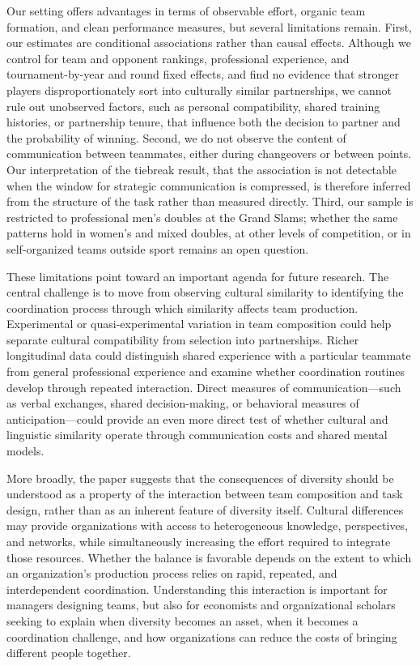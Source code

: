 \documentclass[10pt]{article}
\begin{document}
Our setting offers advantages in terms of observable effort, organic team formation, and clean performance measures, but several limitations remain. First, our estimates are conditional associations rather than causal effects. Although we control for team and opponent rankings, professional experience, and tournament-by-year and round fixed effects, and find no evidence that stronger players disproportionately sort into culturally similar partnerships, we cannot rule out unobserved factors, such as personal compatibility, shared training histories, or partnership tenure, that influence both the decision to partner and the probability of winning. Second, we do not observe the content of communication between teammates, either during changeovers or between points. Our interpretation of the tiebreak result, that the association is not detectable when the window for strategic communication is compressed, is therefore inferred from the structure of the task rather than measured directly. Third, our sample is restricted to professional men's doubles at the Grand Slams; whether the same patterns hold in women's and mixed doubles, at other levels of competition, or in self-organized teams outside sport remains an open question.

These limitations point toward an important agenda for future research. The central challenge is to move from observing cultural similarity to identifying the coordination process through which similarity affects team production. Experimental or quasi-experimental variation in team composition could help separate cultural compatibility from selection into partnerships. Richer longitudinal data could distinguish shared experience with a particular teammate from general professional experience and examine whether coordination routines develop through repeated interaction. Direct measures of communication—such as verbal exchanges, shared decision-making, or behavioral measures of anticipation—could provide an even more direct test of whether cultural and linguistic similarity operate through communication costs and shared mental models.

More broadly, the paper suggests that the consequences of diversity should be understood as a property of the interaction between team composition and task design, rather than as an inherent feature of diversity itself. Cultural differences may provide organizations with access to heterogeneous knowledge, perspectives, and networks, while simultaneously increasing the effort required to integrate those resources. Whether the balance is favorable depends on the extent to which an organization's production process relies on rapid, repeated, and interdependent coordination. Understanding this interaction is important for managers designing teams, but also for economists and organizational scholars seeking to explain when diversity becomes an asset, when it becomes a coordination challenge, and how organizations can reduce the costs of bringing different people together.
\newpage
\appendix
\end{document}
